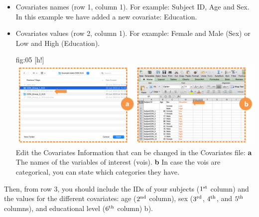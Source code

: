 \documentclass[justified]{tufte-handout}
\begin{document}
\begin{itemize}

\item Covariates names (row 1, column 1). 
For example: Subject ID, Age and Sex. In this example we have added a new covariate: Education.

\item Covariates values (row 2, column 1). 
For example: Female and Male (Sex) or Low and High (Education).

	{fig:05}
	{
	[h!]
	\includegraphics{fig05.png}
	}
	{Edit the Covariates}
	{
	Information that can be changed in the Covariates file: 
	{\bf a} The names of the variables of interest (vois).
	{\bf b} In case the vois are categorical, you can state which categories they have.
	}


\end{itemize}
Then, from row 3, you should include the IDs of your subjects ($1^{\rm st}$ column) and the values for the different covariates: age ($2^{\rm nd}$ column), sex ($3^{\rm rd}$, $4^{\rm th}$, and $5^{\rm th}$ columns), and educational level ($6^{\rm th}$ column) b).	
\end{document}
